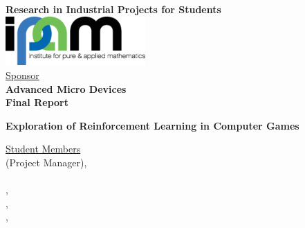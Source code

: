 \thispagestyle{empty}

\def\shiftdowna{0.32in}  %
\def\shiftdownb{0.22in}  %

\begin{center}
\textbf{{\large Research in Industrial Projects for Students}}\\

\vspace \shiftdowna
\includegraphics[width=0.4\textwidth]{Graphics/ipamlogo_cmyk_full_lg.eps}\\


\vspace \shiftdowna
\underline {Sponsor}\\ 
\vspace{5pt}
 \textbf{\large Advanced Micro Devices}  \\
\vspace \shiftdowna
\textbf{Final Report}

\vspace \shiftdowna
\textbf{{\Large Exploration of Reinforcement Learning in Computer Games}}


\vspace{0.35in}
\underline {Student Members}\\
\vspace{5pt}
 (Project Manager),  \\ 
\vspace{3pt}
 \\
\vspace{3pt}
,   \\
\vspace{3pt}
,   \\
\vspace{3pt}
 ,    \\



\end{center}

